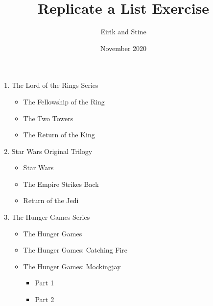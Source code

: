 \documentclass{article}
\title{Replicate a List Exercise}
\author{Eirik and Stine }
\date{November 2020}
\begin{document}
\maketitle

\begin{enumerate}
    \item The Lord of the Rings Series
    \begin{itemize}
        \item The Fellowship of the Ring
        \item The Two Towers
        \item The Return of the King
    \end{itemize}
    \item Star Wars Original Trilogy
    \begin{itemize}
        \item Star Wars
        \item The Empire Strikes Back
        \item Return of the Jedi
    \end{itemize}
    \item The Hunger Games Series
    \begin{itemize}
        \item The Hunger Games
        \item The Hunger Games: Catching Fire 
        \item The Hunger Games: Mockingjay
        \begin{itemize}
            \item Part 1
            \item Part 2
        \end{itemize}
    \end{itemize}
\end{enumerate}
\end{document}
